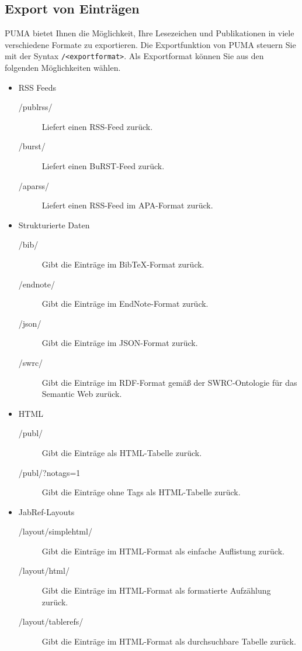 \subsection{Export von Einträgen}
\label{export}
PUMA bietet Ihnen die Möglichkeit, Ihre Lesezeichen und Publikationen in viele verschiedene Formate zu exportieren.
Die Exportfunktion von PUMA steuern Sie mit der Syntax \texttt{/<exportformat>}. Als Exportformat können Sie aus den folgenden Möglichkeiten wählen.

\begin{itemize}
    \item RSS Feeds
    \begin{description}
        \item [/publrss/] Liefert einen RSS-Feed zurück.
        \item [/burst/]  Liefert einen BuRST-Feed zurück.
        \item [/aparss/] Liefert einen RSS-Feed im APA-Format zurück.
    \end{description}
    \item Strukturierte Daten
    \begin{description}
        \item [/bib/] Gibt die Einträge im BibTeX-Format zurück.
        \item [/endnote/] Gibt die Einträge im EndNote-Format zurück.
        \item[/json/] Gibt die Einträge im JSON-Format zurück.
        \item[/swrc/] Gibt die Einträge im  RDF-Format gemäß der SWRC-Ontologie für das Semantic Web zurück.
    \end{description}
    \item HTML
    \begin{description}
        \item [/publ/] Gibt die Einträge als HTML-Tabelle zurück.
        \item [/publ/?notags=1] Gibt die Einträge ohne Tags als HTML-Tabelle zurück.
    \end{description}
  \item JabRef-Layouts
    \begin{description}
  \item[/layout/simplehtml/] Gibt die Einträge im HTML-Format als einfache Auflistung zurück.
  \item[/layout/html/] Gibt die Einträge im HTML-Format als formatierte Aufzählung zurück.
  \item[/layout/tablerefs/] Gibt die Einträge im HTML-Format als durchsuchbare Tabelle zurück.

\end{description}
\end{itemize}
